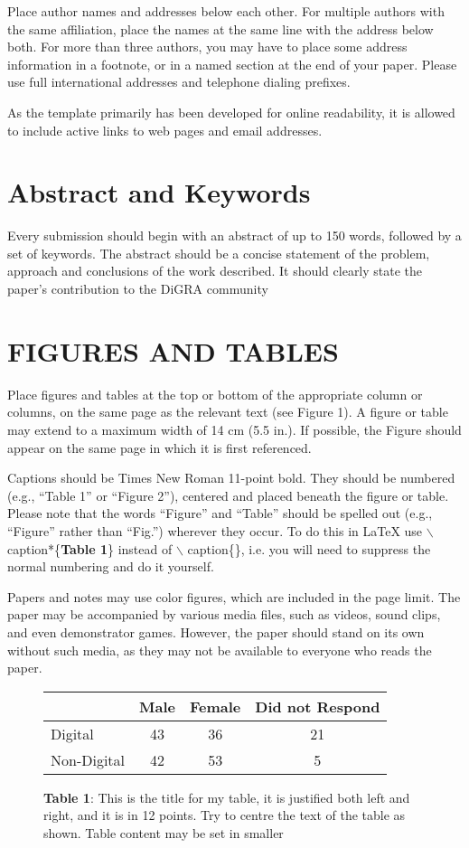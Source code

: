 \documentclass[11pt]{article}
\begin{document}
Place author names and addresses below each other. For multiple
authors with the same affiliation, place the names at the same line with the address below
both. For more than three authors, you may have to place some address information in a
footnote, or in a named section at the end of your paper. Please use full international
addresses and telephone dialing prefixes.

As the template primarily has been developed for online readability, it is allowed to
include active links to web pages and email addresses.
\section*{Abstract and Keywords}
Every submission should begin with an abstract of up to 150 words, followed by a set of
keywords. The abstract should be a concise statement of the problem, approach and
conclusions of the work described. It should clearly state the paper's contribution to the
DiGRA community
\section*{FIGURES AND TABLES}
Place figures and tables at the top or bottom of the appropriate column or columns, on the
same page as the relevant text (see Figure 1). A figure or table may extend to a maximum
width of 14 cm (5.5 in.). If possible, the Figure should appear on the same page in which
it is first referenced.

Captions should be Times New Roman 11-point bold. They should be numbered (e.g.,
``Table 1'' or ``Figure 2''), centered and placed beneath the figure or table. Please note that
the words ``Figure'' and ``Table'' should be spelled out (e.g., ``Figure'' rather than ``Fig.'')
wherever they occur.  To do this in LaTeX use $\backslash$ caption*\{\textbf{Table 1}\} instead of  $\backslash$ caption\{\}, i.e. you will need to suppress the normal numbering and do it yourself.

Papers and notes may use color figures, which are included in the page limit. The paper
may be accompanied by various media files, such as videos, sound clips, and even
demonstrator games. However, the paper should stand on its own without such media, as
they may not be available to everyone who reads the paper.
\begin{figure}[h]
\centering
\begin{tabular}{| l | c | c | c |}
\hline
  & \textbf{Male} & \textbf{Female} & \textbf{Did not Respond} \\
  \hline
Digital &43 &36 &21\\
\hline
Non-Digital &42 &53 &5 \\
\hline
\end{tabular}
\caption*{\textbf{Table 1}: This is the title for my table, it is justified both left and right, and it is in 12
points. Try to centre the text of the table as shown. Table content may be set in smaller}
\end{figure}
\end{document}
